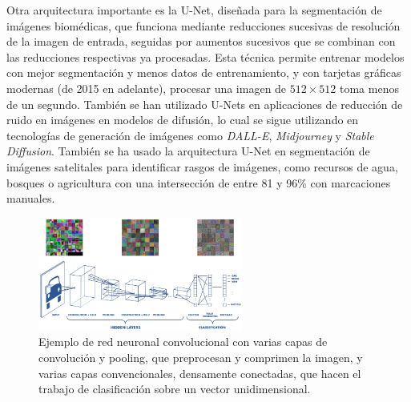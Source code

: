 Otra arquitectura importante es la U-Net, diseñada para la segmentación de imágenes biomédicas, que funciona mediante
reducciones sucesivas de resolución de la imagen de entrada, seguidas por aumentos sucesivos que se combinan con las
reducciones respectivas ya procesadas. Esta técnica permite entrenar modelos con mejor segmentación y menos datos de
entrenamiento, y con tarjetas gráficas modernas (de 2015 en adelante), procesar una imagen de $512 \times 512$ toma
menos de un segundo. \autocite{ronneberger2015unetconvolutionalnetworksbiomedical} También se han utilizado U-Nets en
aplicaciones de reducción de ruido en imágenes en modelos de difusión, lo cual se sigue utilizando en tecnologías de
generación de imágenes como {\it DALL-E}, {\it Midjourney} y {\it Stable Diffusion}. \autocite{ho2020denoising} También
se ha usado la arquitectura U-Net en segmentación de imágenes satelitales para identificar rasgos de imágenes, como
recursos de agua, bosques o agricultura con una intersección de entre 81 y 96\% con marcaciones manuales.
\autocite{khryashchev2018}

\begin{figure}
    \centering
    \includegraphics[width=0.6\textwidth]{img/cnn-figure.png}
    \caption{Ejemplo de red neuronal convolucional con varias capas de convolución y pooling, que preprocesan y
    comprimen la imagen, y varias capas convencionales, densamente conectadas, que hacen el trabajo de
    clasificación sobre un vector unidimensional.}
    \label{fig:2}
\end{figure}
